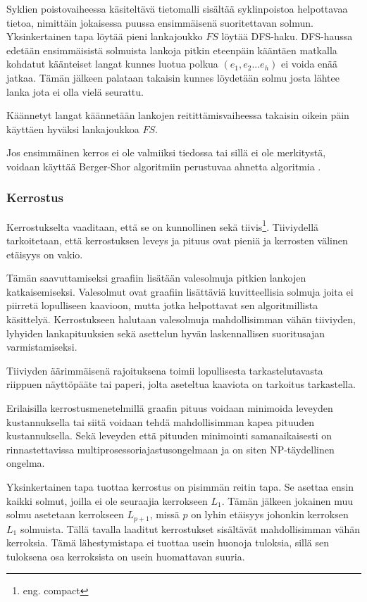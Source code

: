 \documentclass[finnish,12pt]{article}
\begin{document}
Syklien poistovaiheessa käsiteltävä tietomalli sisältää syklinpoistoa helpottavaa tietoa, nimittäin jokaisessa puussa ensimmäisenä suoritettavan solmun.
Yksinkertainen tapa löytää pieni lankajoukko $FS$ löytää DFS-haku.
DFS-haussa edetään ensimmäisistä solmuista lankoja pitkin eteenpäin kääntäen matkalla kohdatut käänteiset langat kunnes luotua polkua $(e_1,e_2...e_h)$ ei voida enää jatkaa.
Tämän jälkeen palataan takaisin kunnes löydetään solmu josta lähtee lanka jota ei olla vielä seurattu.
\cite{RefWorks:69}

Käännetyt langat käännetään lankojen reitittämisvaiheessa takaisin oikein päin käyttäen hyväksi lankajoukkoa $FS$.

Jos ensimmäinen kerros ei ole valmiiksi tiedossa tai sillä ei ole merkitystä, voidaan käyttää Berger-Shor algoritmiin \cite{RefWorks:68} perustuvaa ahnetta algoritmia \cite{RefWorks:48}.

		\subsubsection{Kerrostus}

Kerrostukselta vaaditaan, että se on kunnollinen sekä tiivis\footnote{eng. compact}.
Tiiviydellä tarkoitetaan, että kerrostuksen leveys ja pituus ovat pieniä ja kerrosten välinen etäisyys on vakio. 

Tämän saavuttamiseksi graafiin lisätään valesolmuja pitkien lankojen katkaisemiseksi.
Valesolmut ovat graafiin lisättäviä kuvitteellisia solmuja joita ei piirretä lopulliseen kaavioon, mutta jotka helpottavat sen algoritmillista käsittelyä.
Kerrostukseen halutaan valesolmuja mahdollisimman vähän tiiviyden, lyhyiden lankapituuksien sekä asettelun hyvän laskennallisen suoritusajan varmistamiseksi.

Tiiviyden äärimmäisenä rajoituksena toimii lopullisesta tarkastelutavasta riippuen näyttöpääte tai paperi, jolta aseteltua kaaviota on tarkoitus tarkastella.

Erilaisilla kerrostusmenetelmillä graafin pituus voidaan minimoida leveyden kustannuksella tai siitä voidaan tehdä mahdollisimman kapea pituuden kustannuksella.
Sekä leveyden että pituuden minimointi samanaikaisesti on rinnastettavissa multiprosessoriajastusongelmaan ja on siten NP-täydellinen ongelma. \cite{RefWorks:39}

Yksinkertainen tapa tuottaa kerrostus on pisimmän reitin tapa. Se asettaa ensin kaikki solmut, joilla ei ole seuraajia kerrokseen $L_1$.
Tämän jälkeen jokainen muu solmu asetetaan kerrokseen $L_{p+1}$, missä $p$ on lyhin etäisyys johonkin kerroksen $L_1$ solmuista.
Tällä tavalla laaditut kerrostukset sisältävät mahdollisimman vähän kerroksia.
Tämä lähestymistapa ei tuottaa usein huonoja tuloksia, sillä sen tuloksena osa kerroksista on usein huomattavan suuria.
\end{document}
